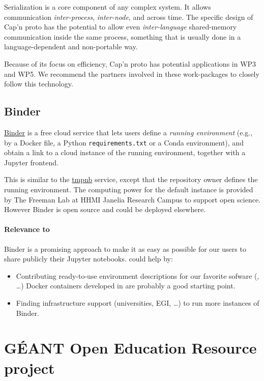 \documentclass{deliverablereport}
\begin{document}
Serialization is a core component of any complex system. It allows
communication \emph{inter-process}, \emph{inter-node}, and across
time. The specific design of Cap'n proto has the potential to allow
even \emph{inter-language} shared-memory communication inside the same
process, something that is usually done in a language-dependent and
non-portable way.

Because of its focus on efficiency, Cap'n proto has potential
applications in WP3 and WP5. We recommend the partners involved in
these work-packages to closely follow this technology.


\subsection{Binder}
\label{sec:binder}

\href{http://mybinder.com}{Binder} is a free cloud service that lets
users define a \emph{running environment} (e.g., by a Docker file, a
Python \texttt{requirements.txt} or a Conda environment), and obtain a
link to a cloud instance of the running environment, together with a
Jupyter frontend.

This is similar to the \href{http://tmpnb.org/}{tmpnb} service, except
that the repository owner defines the running environment.  The
computing power for the default instance is provided by The Freeman
Lab at HHMI Janelia Research Campus to support open science. However
Binder is open source and could be deployed elsewhere.

\paragraph{Relevance to \ODK} Binder is a promising approach to make
it as easy as possible for our users to share publicly their Jupyter
notebooks. \ODK could help by:

\begin{itemize}
\item Contributing ready-to-use environment descriptions for our
  favorite sofware (\GAP, \dots) Docker containers developed in
   are probably a
  good starting point.
\item Finding infrastructure support (universities, EGI, \dots) to run
  more instances of Binder.
\end{itemize}


\section{GÉANT Open Education Resource project}
\end{document}
